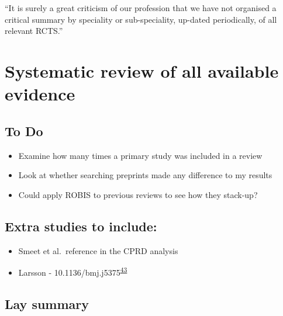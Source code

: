 \documentclass[a4paper, twoside]{templates/ociamthesis}
\providecommand{\tightlist}{%
  \setlength{\itemsep}{0pt}\setlength{\parskip}{0pt}}
\begin{document}
\begin{savequote}
``It is surely a great criticism of our profession that we have not
organised a critical summary by speciality or sub-speciality, up-dated
periodically, of all relevant RCTS.''
\end{savequote}



\hypertarget{sys-rev-heading}{%
\chapter{Systematic review of all available evidence}\label{sys-rev-heading}}

\minitoc 

\hypertarget{to-do}{%
\section{To Do}\label{to-do}}

\begin{itemize}
\tightlist
\item
  Examine how many times a primary study was included in a review\\
\item
  Look at whether searching preprints made any difference to my results
\item
  Could apply ROBIS to previous reviews to see how they stack-up?
\end{itemize}

\hypertarget{extra-studies-to-include}{%
\section{Extra studies to include:}\label{extra-studies-to-include}}

\begin{itemize}
\tightlist
\item
  Smeet et al.~reference in the CPRD analysis
\item
  Larsson - 10.1136/bmj.j5375\textsuperscript{\protect\hyperlink{ref-larsson2017b}{43}}
\end{itemize}

\hypertarget{lay-summary-2}{%
\section{Lay summary}\label{lay-summary-2}}
\end{document}
